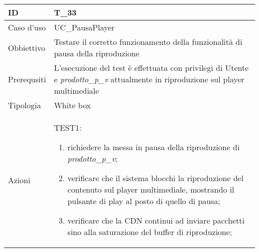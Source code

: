 \begin{table}[hb]
    \centering
    \begin{tabular}{ |p{2cm}|p{10cm}|  }
        \hline
        ID          & T\_33                                                                                                                                   \\\hline
        Caso d'uso  & UC\_PausaPlayer                                                                                                                         \\\hline
        Obbiettivo  & Testare il corretto funzionamento della funzionalità di pausa della riproduzione                                                        \\\hline
        Prerequsiti & L'esecuzione del test è effettuata con privilegi di Utente e \emph{prodotto\_p\_v} attualmente in riproduzione sul player multimediale \\\hline
        Tipologia   & White box                                                                                                                               \\\hline
        Azioni      &
        TEST1:
        \begin{enumerate}[nosep, topsep=0pt]
            \item richiedere la messa in pausa della riproduzione di \emph{prodotto\_p\_v};
            \item verificare che il sistema blocchi la riproduzione del contenuto sul player multimediale, mostrando il pulsante di play al posto di quello di pausa;
            \item verificare che la CDN continui ad inviare pacchetti sino alla saturazione del buffer di riproduzione;
        \end{enumerate}
        \\\hline
    \end{tabular}
\end{table}

